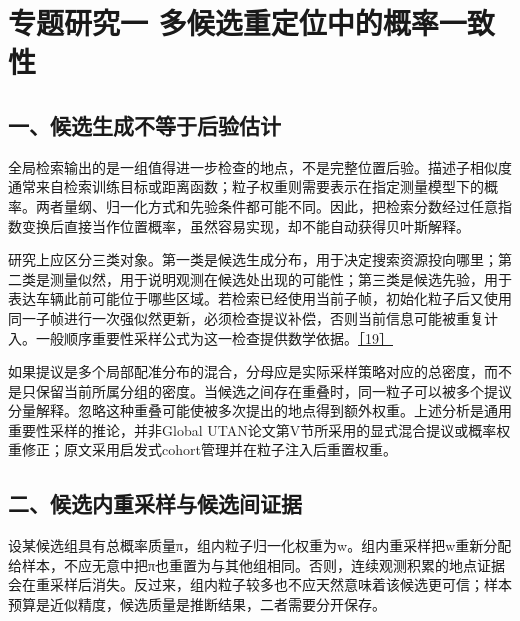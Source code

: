 \hypertarget{ux4e13ux9898ux7814ux7a76ux4e00-ux591aux5019ux9009ux91cdux5b9aux4f4dux4e2dux7684ux6982ux7387ux4e00ux81f4ux6027}{%
\section{专题研究一 多候选重定位中的概率一致性}\label{ux4e13ux9898ux7814ux7a76ux4e00-ux591aux5019ux9009ux91cdux5b9aux4f4dux4e2dux7684ux6982ux7387ux4e00ux81f4ux6027}}

\hypertarget{ux4e00ux5019ux9009ux751fux6210ux4e0dux7b49ux4e8eux540eux9a8cux4f30ux8ba1}{%
\subsection{一、候选生成不等于后验估计}\label{ux4e00ux5019ux9009ux751fux6210ux4e0dux7b49ux4e8eux540eux9a8cux4f30ux8ba1}}

全局检索输出的是一组值得进一步检查的地点，不是完整位置后验。描述子相似度通常来自检索训练目标或距离函数；粒子权重则需要表示在指定测量模型下的概率。两者量纲、归一化方式和先验条件都可能不同。因此，把检索分数经过任意指数变换后直接当作位置概率，虽然容易实现，却不能自动获得贝叶斯解释。

研究上应区分三类对象。第一类是候选生成分布，用于决定搜索资源投向哪里；第二类是测量似然，用于说明观测在候选处出现的可能性；第三类是候选先验，用于表达车辆此前可能位于哪些区域。若检索已经使用当前子帧，初始化粒子后又使用同一子帧进行一次强似然更新，必须检查提议补偿，否则当前信息可能被重复计入。一般顺序重要性采样公式为这一检查提供数学依据。\href{https://doi.org/10.1109/78.978374}{［19］}

如果提议是多个局部配准分布的混合，分母应是实际采样策略对应的总密度，而不是只保留当前所属分组的密度。当候选之间存在重叠时，同一粒子可以被多个提议分量解释。忽略这种重叠可能使被多次提出的地点得到额外权重。上述分析是通用重要性采样的推论，并非Global UTAN论文第V节所采用的显式混合提议或概率权重修正；原文采用启发式cohort管理并在粒子注入后重置权重。

\hypertarget{ux4e8cux5019ux9009ux5185ux91cdux91c7ux6837ux4e0eux5019ux9009ux95f4ux8bc1ux636e}{%
\subsection{二、候选内重采样与候选间证据}\label{ux4e8cux5019ux9009ux5185ux91cdux91c7ux6837ux4e0eux5019ux9009ux95f4ux8bc1ux636e}}

设某候选组具有总概率质量π，组内粒子归一化权重为w。组内重采样把w重新分配给样本，不应无意中把π也重置为与其他组相同。否则，连续观测积累的地点证据会在重采样后消失。反过来，组内粒子较多也不应天然意味着该候选更可信；样本预算是近似精度，候选质量是推断结果，二者需要分开保存。

